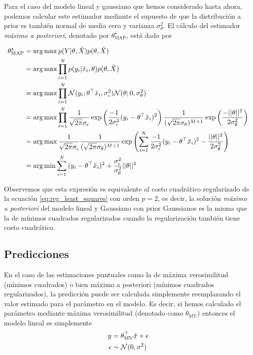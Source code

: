 Para el caso del modelo lineal y gaussiano que hemos considerado hasta ahora, podemos calcular este estimador mediante el supuesto de que la distribución a prior es también normal de media cero y varianza $\sigma_\theta^2$. El cálculo del estimador \emph{máximo a posteriori}, denotado por $\theta_\text{MAP}^\star $, está dado por 

\begin{align}
	\theta_\text{MAP}^\star 	&= \operatorname*{arg\,max} p(Y|\theta,\tilde{X})p(\theta,\tilde{X})\nonumber\\
								&= \operatorname*{arg\,max} \prod_{i=1}^Np(y_i|\tilde{x}_i,\theta)p(\theta,\tilde{X})\nonumber\\
								&= \operatorname*{arg\,max} \prod_{i=1}^N {\mathcal N}(y_i;\theta^\top\tilde{x}_i,\sigma_\epsilon^2){\mathcal N}(\theta;0,\sigma_\theta^2) \nonumber\\
								&= \operatorname*{arg\,max} \prod_{i=1}^N \frac{1}{\sqrt{2\pi}\sigma_\epsilon} \exp\left({\frac{-1}{2\sigma_\epsilon^2}(y_i-\theta^\top\tilde{x}_i)^2}\right)
											\frac{1}{(\sqrt{2\pi}\sigma_\theta)^{M+1}} \exp\left({\frac{-||\theta||^2}{2\sigma_\theta^2}}\right) \nonumber\\
								&= \operatorname*{arg\,max}  \frac{1}{\sqrt{2\pi}\sigma_\epsilon} \frac{1}{(\sqrt{2\pi}\sigma_\theta)^{M+1}}
											\exp\left( \sum_{i=1}^N{\frac{-1}{2\sigma_\epsilon^2}(y_i-\theta^\top\tilde{x}_i)^2} -{\frac{||\theta||^2}{2\sigma_\theta^2}}\right) \nonumber\\
								&= \operatorname*{arg\,min} \sum_{i=1}^N{(y_i-\theta^\top\tilde{x}_i)^2} +{\frac{\sigma_\epsilon^2}{\sigma_\theta^2}||\theta||^2}
\end{align}

Observemos que esta expresión es equivalente al costo cuadrático regularizado de la ecuación \eqref{eq:reg_least_squares} con orden $p=2$, es decir, la solución \emph{máximo a posteriori} del modelo lineal y Gaussiano con prior Gaussianos es la misma que la de mínimos cuadrados regularizados cuando la regularización también tiene costo cuadrático. 


\subsection{Predicciones} %
\label{sub:predicciones}
En el caso de las estimaciones puntuales como la de máxima verosimilitud (mínimos cuadrados) o bien máximo a posteriori (mínimos cuadrados regularizados), la predicción puede ser calculada simplemente reemplazando el valor estimado para el parámetro en el modelo. Es decir, si hemos calculado el parámetro mediante máxima verosimilitud (denotado como $\theta_{\text{MV}}$) entonces el modelo lineal es simplemente 
\begin{align}
	 y &= \theta_{\text{MV}}^\top \tilde{x} + \epsilon\\
	 \epsilon &\sim {\mathcal N}(0,\sigma^2)
\end{align}

